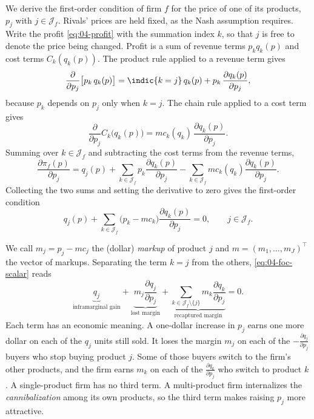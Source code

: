 We derive the first-order condition of firm $f$ for the price of one of its products, $p_j$ with
$j \in \mathcal{J}_f$. Rivals' prices are held fixed, as the Nash assumption requires. Write the profit
\eqref{eq:04-profit} with the summation index $k$, so that $j$ is free to denote the price being changed. Profit
is a sum of revenue terms $p_k q_k(p)$ and cost terms $C_k(q_k(p))$. The product rule applied to a revenue term
gives
\begin{equation*}
\frac{\partial}{\partial p_j}\big[p_k\,q_k(p)\big] = \indic\{k = j\}\,q_k(p) + p_k\,\frac{\partial q_k(p)}{\partial p_j},
\end{equation*}
because $p_k$ depends on $p_j$ only when $k = j$. The chain rule applied to a cost term gives
\begin{equation*}
\frac{\partial}{\partial p_j}C_k\big(q_k(p)\big) = mc_k(q_k)\,\frac{\partial q_k(p)}{\partial p_j}.
\end{equation*}
Summing over $k \in \mathcal{J}_f$ and subtracting the cost terms from the revenue terms,
\begin{equation*}
\frac{\partial \pi_f(p)}{\partial p_j}
= q_j(p) + \sum_{k \in \mathcal{J}_f} p_k\frac{\partial q_k(p)}{\partial p_j}
- \sum_{k \in \mathcal{J}_f} mc_k(q_k)\frac{\partial q_k(p)}{\partial p_j}.
\end{equation*}
Collecting the two sums and setting the derivative to zero gives the first-order condition
\begin{equation}\label{eq:04-foc-scalar}
q_j(p) + \sum_{k \in \mathcal{J}_f}\big(p_k - mc_k\big)\frac{\partial q_k(p)}{\partial p_j} = 0,
\qquad j \in \mathcal{J}_f.
\end{equation}

We call $m_j = p_j - mc_j$ the (dollar) \emph{markup} of product $j$ and $m = (m_1, \dots, m_J)^\top$ the vector
of markups. Separating the term $k = j$ from the others, \eqref{eq:04-foc-scalar} reads
\begin{equation*}
\underbrace{q_j}_{\text{inframarginal gain}}
+ \underbrace{m_j\frac{\partial q_j}{\partial p_j}}_{\text{lost margin}}
+ \underbrace{\sum_{k \in \mathcal{J}_f\setminus\{j\}} m_k\frac{\partial q_k}{\partial p_j}}_{\text{recaptured margin}}
= 0.
\end{equation*}
Each term has an economic meaning. A one-dollar increase in $p_j$ earns one more dollar on each of the $q_j$
units still sold. It loses the margin $m_j$ on each of the $-\frac{\partial q_j}{\partial p_j}$ buyers who stop
buying product $j$. Some of those buyers switch to the firm's other products, and the firm earns $m_k$ on each of
the $\frac{\partial q_k}{\partial p_j}$ who switch to product $k$. A single-product firm has no third term. A
multi-product firm internalizes the \emph{cannibalization} among its own products, so the third term makes
raising $p_j$ more attractive.


